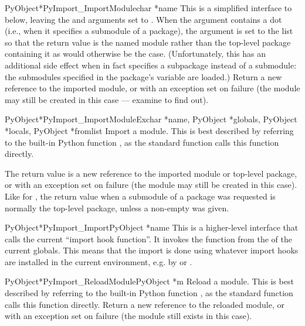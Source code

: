 \documentclass{manual}
\begin{document}
\begin{cfuncdesc}{PyObject*}{PyImport_ImportModule}{char *name}
This is a simplified interface to
 below, leaving the
 and  arguments set to \NULL{}.  When the
 argument contains a dot (i.e., when it specifies a
submodule of a package), the  argument is set to the
list \code{['*']} so that the return value is the named module rather
than the top-level package containing it as would otherwise be the
case.  (Unfortunately, this has an additional side effect when
 in fact specifies a subpackage instead of a submodule: the
submodules specified in the package's  variable are
loaded.)  Return a
new reference to the imported module, or
\NULL{} with an exception set on failure (the module may still be
created in this case --- examine  to find out).
\end{cfuncdesc}

\begin{cfuncdesc}{PyObject*}{PyImport_ImportModuleEx}{char *name, PyObject *globals, PyObject *locals, PyObject *fromlist}
Import a module.  This is best described by referring to the built-in
Python function , as
the standard  function calls this function
directly.

The return value is a new reference to the imported module or
top-level package, or \NULL{} with an exception set on failure
(the module may still be created in this case).  Like for
, the return value when a submodule of a
package was requested is normally the top-level package, unless a
non-empty  was given.
\end{cfuncdesc}

\begin{cfuncdesc}{PyObject*}{PyImport_Import}{PyObject *name}
This is a higher-level interface that calls the current ``import hook
function''.  It invokes the  function from the
 of the current globals.  This means that the
import is done using whatever import hooks are installed in the
current environment, e.g. by  or
.
\end{cfuncdesc}

\begin{cfuncdesc}{PyObject*}{PyImport_ReloadModule}{PyObject *m}
Reload a module.  This is best described by referring to the built-in
Python function , as the standard
 function calls this function directly.  Return a
new reference to the reloaded module, or \NULL{} with an exception set
on failure (the module still exists in this case).
\end{cfuncdesc}
\end{document}
